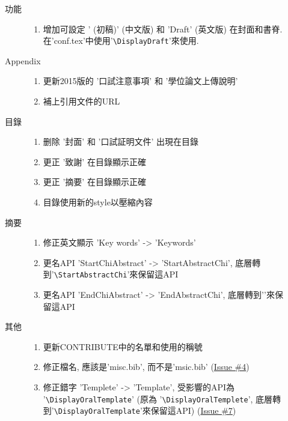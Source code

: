 \begin{description}
\begin{description}
\begin{enumerate}
        \end{enumerate}
      \item[功能] \hfill
        \begin{enumerate}
          \item 增加可設定 ' (初稿)' (中文版) 和 'Draft' (英文版) 在封面和書脊. 在'conf.tex'中使用'\verb|\DisplayDraft|'來使用.
        \end{enumerate}
      \item[Appendix] \hfill
        \begin{enumerate}
          \item 更新2015版的 '口試注意事項' 和 '學位論文上傳說明'
          \item 補上引用文件的URL
        \end{enumerate}
      \item[目錄] \hfill
        \begin{enumerate}
          \item 删除 '封面' 和 '口試証明文件' 出現在目錄
          \item 更正 '致謝' 在目錄顯示正確
          \item 更正 '摘要' 在目錄顯示正確
          \item 目錄使用新的style以壓縮內容
        \end{enumerate}
      \item[摘要] \hfill
        \begin{enumerate}
          \item 修正英文顯示 'Key words' -> 'Keywords'
          \item 更名API 'StartChiAbstract' -> 'StartAbstractChi', 底層轉到'\verb|\StartAbstractChi|'來保留這API
          \item 更名API 'EndChiAbstract' -> 'EndAbstractChi', 底層轉到'\EndAbstractChi'來保留這API
        \end{enumerate}
      \item[其他] \hfill
        \begin{enumerate}
          \item 更新CONTRIBUTE中的名單和使用的稱號
          \item 修正檔名, 應該是'misc.bib', 而不是'msic.bib' (\href{https://github.com/wengan-li/ncku-thesis-template-latex/issues/4}{Issue \#4})
          \item 修正錯字 'Templete' -> 'Template', 受影響的API為 '\verb|\DisplayOralTemplate|' (原為 '\verb|\DisplayOralTemplete|', 底層轉到'\verb|\DisplayOralTemplate|'來保留這API) (\href{https://github.com/wengan-li/ncku-thesis-template-latex/issues/7}{Issue \#7})

\end{enumerate}
\end{description}
\end{description}
